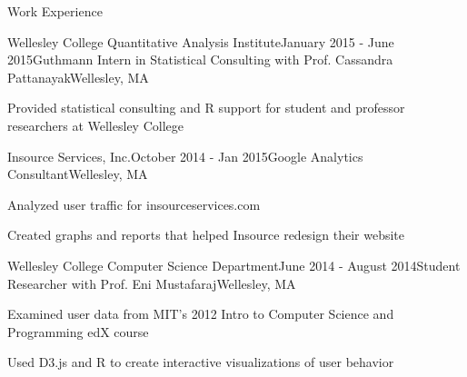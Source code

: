 \documentclass{resume} %
\begin{document}
\begin{rSection}{Work Experience}


\begin{rSubsection}{Wellesley College Quantitative Analysis Institute}{January 2015 - June 2015}{Guthmann Intern in Statistical Consulting with Prof. Cassandra Pattanayak}{Wellesley, MA}
\item Provided statistical consulting and R support for student and professor researchers at Wellesley College
\end{rSubsection}


\begin{rSubsection}{Insource Services, Inc.}{October 2014 - Jan 2015}{Google Analytics Consultant}{Wellesley, MA}
\item Analyzed user traffic for insourceservices.com
\item Created graphs and reports that helped Insource redesign their website
\end{rSubsection}




\begin{rSubsection}{Wellesley College Computer Science Department}{June 2014 - August 2014}{Student Researcher with Prof. Eni Mustafaraj}{Wellesley, MA}
\item Examined user data from MIT's 2012 Intro to Computer Science and Programming edX course
\item Used D3.js and R to create interactive visualizations of user behavior
\end{rSubsection}




\end{rSection}
\end{document}
